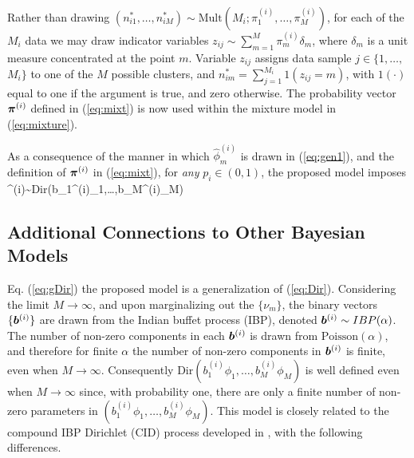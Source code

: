 \documentclass[journal]{IEEEtran}
\begin{document}
Rather than drawing $(n_{i1}^*,\dots,n_{iM}^*)\sim\mbox{Mult}(M_i;\pi_1^{(i)},\dots,\pi_M^{(i)})$, for each of the $M_i$ data we may draw indicator variables $z_{ij}\sim\sum_{m=1}^M\pi_m^{(i)}\delta_m$, where $\delta_m$ is a unit measure concentrated at the point $m$. Variable $z_{ij}$ assigns data sample $j\in\{1,\dots,$ $M_i$$\}$ to one of the $M$ possible clusters, and $n_{im}^*=\sum_{j=1}^{M_i} 1(z_{ij}=m)$, with $1(\cdot)$ equal to one if the argument is true, and zero otherwise. The probability vector $\boldsymbol{\pi}^{(i)}$ defined in (\ref{eq:mixt}) is now used within the mixture model in (\ref{eq:mixture}).


As a consequence of the manner in which $\hat{\phi}_m^{(i)}$ is drawn in (\ref{eq:gen1}), and the definition of $\boldsymbol{\pi}^{(i)}$ in (\ref{eq:mixt}), for \emph{any} $p_i\in(0,1)$, the proposed model imposes
\beq \piv^{(i)}\sim\mbox{Dir}(b_1^{(i)}{\phi}_1,\dots,b_M^{(i)}{\phi}_M) \label{eq:gDir} \eeq


\subsection{Additional Connections to Other Bayesian Models} %
\label{sub:additional_connections_to_other_bayesian_models}


Eq. (\ref{eq:gDir})  the proposed model is a generalization of (\ref{eq:Dir}). Considering the limit $M\rightarrow\infty$, and upon marginalizing out the $\{\nu_m\}$, the binary vectors $\{\boldsymbol{b}^{(i)}\}$ are drawn from the Indian buffet process (IBP), denoted $\boldsymbol{b}^{(i)}\sim\relax{IBP}(\alpha)$. The number of non-zero components in each $\boldsymbol{b}^{(i)}$ is drawn from $\mbox{Poisson}(\alpha)$, and therefore for finite $\alpha$ the number of non-zero components in $\boldsymbol{b}^{(i)}$ is finite, even when $M\rightarrow\infty$. Consequently $\mbox{Dir}(b_1^{(i)}{\phi}_1,\dots,b_M^{(i)}{\phi}_M)$ is well defined even when $M\rightarrow\infty$ since, with probability one, there are only a finite number of non-zero parameters in $(b_1^{(i)}{\phi}_1,\dots,b_M^{(i)}{\phi}_M)$. This model is closely related to the compound IBP Dirichlet (CID) process developed in \cite{compound}, with the following differences.
\end{document}
